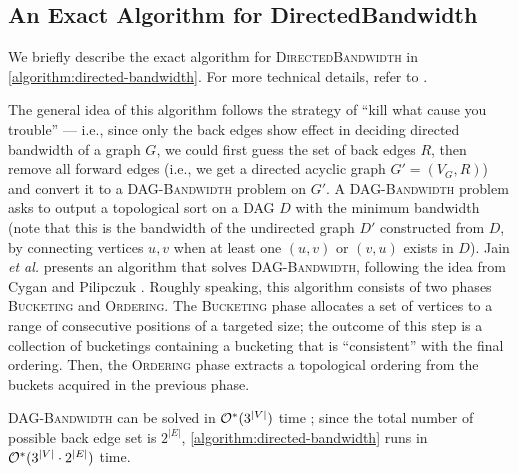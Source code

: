 \subsection{An Exact Algorithm for DirectedBandwidth} \label{subsec:exact-algorithm-directed-bandwidth}

We briefly describe the exact algorithm for \textsc{DirectedBandwidth} in \cref{algorithm:directed-bandwidth}.
%
For more technical details, refer to \cite{FSTTCS:JKLSS19}.

The general idea of this algorithm follows the strategy of ``kill what cause you
trouble'' --- i.e., since only the back edges show effect in deciding directed
bandwidth of a graph $G$, we could first guess the set of back edges $R$, then
remove all forward edges (i.e., we get a directed acyclic graph $G' = (V_G, R)$)
and convert it to a \textsc{DAG-Bandwidth} problem on $G'$.
%
A \textsc{DAG-Bandwidth} problem asks to output a topological sort on a DAG $D$ with the minimum bandwidth (note that this is the bandwidth of the undirected graph $D'$ constructed from $D$, by connecting vertices $u, v$ when at least one $(u,v)$ or $(v, u)$ exists in $D$).
%
Jain \textit{et al.} \cite[Section 3]{FSTTCS:JKLSS19} presents an algorithm
that solves \textsc{DAG-Bandwidth}, following the idea from Cygan and Pilipczuk \cite{CygPil08}.
%
Roughly speaking, this algorithm consists of two phases \textsc{Bucketing} and \textsc{Ordering}.
%
The \textsc{Bucketing} phase allocates a set of vertices to a range of consecutive positions of a targeted size; the outcome of this step is a collection of bucketings containing a bucketing that is ``consistent'' with the final ordering.
%
Then, the \textsc{Ordering} phase extracts a topological ordering from the buckets acquired in the previous phase.



\textsc{DAG-Bandwidth} can be solved in $\mathcal{O}^\ast(3^{|V|})$ time \cite{CygPil08,FSTTCS:JKLSS19}; since the total number of possible back edge set is $2^{|E|}$, \cref{algorithm:directed-bandwidth} runs in $\mathcal{O}^\ast(3^{|V|} \cdot 2^{|E|})$ time.